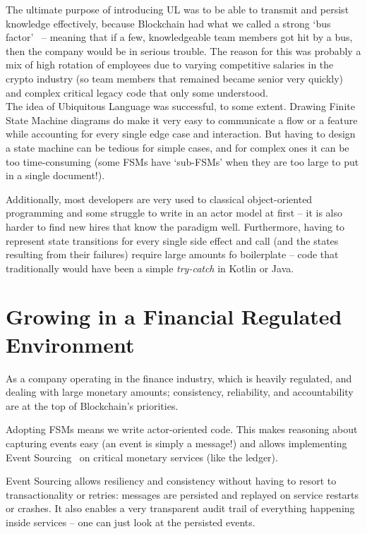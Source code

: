 \documentclass[conference]{IEEEtran}
\begin{document}
    The ultimate purpose of introducing UL was to be able to transmit and persist knowledge
    effectively, because Blockchain had what we called a strong `bus
    factor'~\cite{bowlerTruckFactor} -- meaning that if a few, knowledgeable team members got hit by
    a bus, then the company would be in serious trouble.
    The reason for this was probably a mix of high rotation of employees due to varying competitive
    salaries in the crypto industry (so team members that remained became senior very quickly) and
    complex critical legacy code that only some understood.\\

    The idea of Ubiquitous Language was successful, to some extent.
    Drawing Finite State Machine diagrams do make it very easy to communicate a flow or a feature while
    accounting for every single edge case and interaction.
    But having to design a state machine can be tedious for simple cases, and
    for complex ones it can be too time-consuming (some FSMs have `sub-FSMs' when they are too large
    to put in a single document!).

    Additionally, most developers are very used to classical object-oriented programming and some
    struggle to write in an actor model at first -- it is also harder to find new hires that know the
    paradigm well.
    Furthermore, having to represent state transitions for every single side effect and call (and the
    states resulting from their failures) require large amounts fo boilerplate -- code that
    traditionally would have been a simple \emph{try-catch} in Kotlin or Java.

    \section{Growing in a Financial Regulated Environment}

    As a company operating in the finance industry, which is heavily regulated, and dealing
    with large monetary amounts;
    consistency, reliability, and accountability are at the top of Blockchain's priorities.

    Adopting FSMs means we write actor-oriented code.
    This makes reasoning about capturing events easy (an event is simply a message!) and allows
    implementing Event Sourcing~\cite{fowlerES} on critical monetary services (like the ledger).

    Event Sourcing allows resiliency and consistency without having to resort to transactionality
    or retries: messages are persisted and replayed on service restarts or crashes.
    It also enables a very transparent audit trail of everything happening inside services -- one
    can just look at the persisted events.\\
\end{document}
